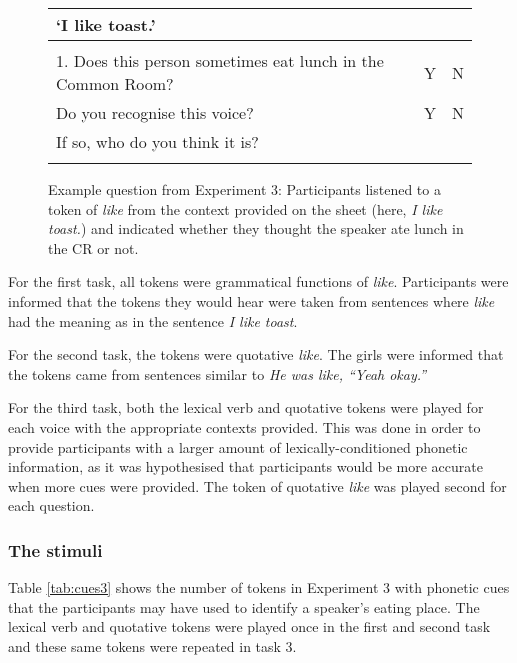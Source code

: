 \begin{figure}[ht]
 \begin{center}
\caption{Example question from Experiment 3: Participants listened to a token of \textit{like} from the context provided on the sheet (here, \textit{I like toast.}) and indicated whether they thought the speaker ate lunch in the CR or not.}\label{ExampleExp3} 

		\begin{tabular}{lrr}
\hline
`I like toast.' & & \\
\hline
\\
1.	Does this person sometimes eat lunch in the Common Room?	& Y	& N \\

Do you recognise this voice?		& Y	& N \\

If so, who do you think it is? & & \\

                     \\	
		\hline
		\end{tabular}
	
	\end{center}
\end{figure}


For the first task, all tokens were grammatical functions of \textit{like}.  Participants were informed that the tokens they would hear were taken from sentences where \textit{like} had the meaning as in the sentence \textit{I like toast}.   

For the second task, the tokens were quotative \textit{like}.  The girls were informed that the tokens came from sentences similar to \textit{He was like,  ``Yeah okay.''}  

For the third task, both the lexical verb and quotative tokens were played for each voice with the appropriate contexts provided.  This was done in order to provide participants with a larger amount of lexically-conditioned phonetic information, as it was hypothesised that participants would be more accurate when more cues were provided.  The token of quotative \textit{like} was played second for each question.

\subsubsection{The stimuli}

Table \ref{tab:cues3} shows the number of tokens in Experiment 3 with phonetic cues that the participants may have used to identify a speaker's eating place.  The lexical verb and quotative tokens were played once in the first and second task and these same tokens were repeated in task 3.


